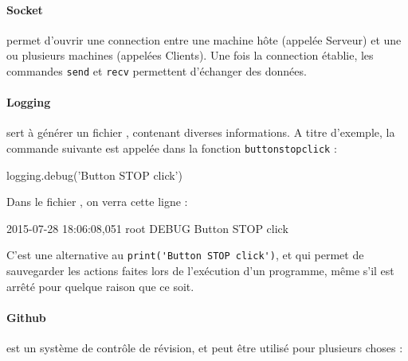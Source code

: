 \documentclass[12pt,a4paper]{report}
\begin{document}
\paragraph{Socket} permet d'ouvrir une connection entre une machine hôte (appelée Serveur) et une ou plusieurs machines (appelées Clients). Une fois la connection établie, les commandes \verb=send= et \verb=recv= permettent d'échanger des données.

\paragraph{Logging} sert à générer un fichier , contenant diverses informations. A titre d'exemple, la commande suivante est appelée dans la fonction \verb=buttonstopclick= :

\begin{verbatimtab}[3]
logging.debug('Button STOP click')
\end{verbatimtab}

Dans le fichier , on verra cette ligne :

\begin{verbatimtab}[3]
2015-07-28 18:06:08,051 root	DEBUG	Button STOP click
\end{verbatimtab}

C'est une alternative au \verb=print('Button STOP click')=, et qui permet de sauvegarder les actions faites lors de l'exécution d'un programme, même s'il est arrêté pour quelque raison que ce soit.

\paragraph{Github} est un système de contrôle de révision, et peut être utilisé pour plusieurs choses :
\end{document}
